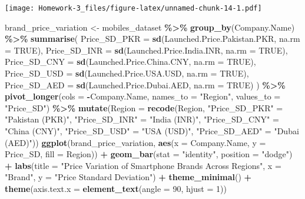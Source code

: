 \documentclass[
]{article}
\newenvironment{Shaded}{\begin{snugshade}}{\end{snugshade}}
\newcommand{\AttributeTok}[1]{\textcolor[rgb]{0.13,0.29,0.53}{#1}}
\newcommand{\ConstantTok}[1]{\textcolor[rgb]{0.56,0.35,0.01}{#1}}
\newcommand{\DecValTok}[1]{\textcolor[rgb]{0.00,0.00,0.81}{#1}}
\newcommand{\FunctionTok}[1]{\textcolor[rgb]{0.13,0.29,0.53}{\textbf{#1}}}
\newcommand{\NormalTok}[1]{#1}
\newcommand{\OtherTok}[1]{\textcolor[rgb]{0.56,0.35,0.01}{#1}}
\newcommand{\SpecialCharTok}[1]{\textcolor[rgb]{0.81,0.36,0.00}{\textbf{#1}}}
\newcommand{\StringTok}[1]{\textcolor[rgb]{0.31,0.60,0.02}{#1}}
\begin{document}
\texttt{[image: Homework-3\_files/figure-latex/unnamed-chunk-14-1.pdf]}

\begin{Shaded}
\begin{Highlighting}[]
\NormalTok{brand\_price\_variation }\OtherTok{\textless{}{-}}\NormalTok{ mobiles\_dataset }\SpecialCharTok{\%\textgreater{}\%}
  \FunctionTok{group\_by}\NormalTok{(Company.Name) }\SpecialCharTok{\%\textgreater{}\%}
  \FunctionTok{summarise}\NormalTok{(}
    \AttributeTok{Price\_SD\_PKR =} \FunctionTok{sd}\NormalTok{(Launched.Price.Pakistan.PKR, }\AttributeTok{na.rm =} \ConstantTok{TRUE}\NormalTok{),}
    \AttributeTok{Price\_SD\_INR =} \FunctionTok{sd}\NormalTok{(Launched.Price.India.INR, }\AttributeTok{na.rm =} \ConstantTok{TRUE}\NormalTok{),}
    \AttributeTok{Price\_SD\_CNY =} \FunctionTok{sd}\NormalTok{(Launched.Price.China.CNY, }\AttributeTok{na.rm =} \ConstantTok{TRUE}\NormalTok{),}
    \AttributeTok{Price\_SD\_USD =} \FunctionTok{sd}\NormalTok{(Launched.Price.USA.USD, }\AttributeTok{na.rm =} \ConstantTok{TRUE}\NormalTok{),}
    \AttributeTok{Price\_SD\_AED =} \FunctionTok{sd}\NormalTok{(Launched.Price.Dubai.AED, }\AttributeTok{na.rm =} \ConstantTok{TRUE}\NormalTok{)}
\NormalTok{  ) }\SpecialCharTok{\%\textgreater{}\%}
  \FunctionTok{pivot\_longer}\NormalTok{(}\AttributeTok{cols =} \SpecialCharTok{{-}}\NormalTok{Company.Name, }\AttributeTok{names\_to =} \StringTok{"Region"}\NormalTok{, }\AttributeTok{values\_to =} \StringTok{"Price\_SD"}\NormalTok{) }\SpecialCharTok{\%\textgreater{}\%}
  \FunctionTok{mutate}\NormalTok{(}\AttributeTok{Region =} \FunctionTok{recode}\NormalTok{(Region,}
                         \StringTok{"Price\_SD\_PKR"} \OtherTok{=} \StringTok{"Pakistan (PKR)"}\NormalTok{,}
                         \StringTok{"Price\_SD\_INR"} \OtherTok{=} \StringTok{"India (INR)"}\NormalTok{,}
                         \StringTok{"Price\_SD\_CNY"} \OtherTok{=} \StringTok{"China (CNY)"}\NormalTok{,}
                         \StringTok{"Price\_SD\_USD"} \OtherTok{=} \StringTok{"USA (USD)"}\NormalTok{,}
                         \StringTok{"Price\_SD\_AED"} \OtherTok{=} \StringTok{"Dubai (AED)"}\NormalTok{))}
\FunctionTok{ggplot}\NormalTok{(brand\_price\_variation, }\FunctionTok{aes}\NormalTok{(}\AttributeTok{x =}\NormalTok{ Company.Name, }\AttributeTok{y =}\NormalTok{ Price\_SD, }\AttributeTok{fill =}\NormalTok{ Region)) }\SpecialCharTok{+}
  \FunctionTok{geom\_bar}\NormalTok{(}\AttributeTok{stat =} \StringTok{"identity"}\NormalTok{, }\AttributeTok{position =} \StringTok{"dodge"}\NormalTok{) }\SpecialCharTok{+}
  \FunctionTok{labs}\NormalTok{(}\AttributeTok{title =} \StringTok{"Price Variation of Smartphone Brands Across Regions"}\NormalTok{,}
       \AttributeTok{x =} \StringTok{"Brand"}\NormalTok{, }\AttributeTok{y =} \StringTok{"Price Standard Deviation"}\NormalTok{) }\SpecialCharTok{+}
  \FunctionTok{theme\_minimal}\NormalTok{() }\SpecialCharTok{+}
  \FunctionTok{theme}\NormalTok{(}\AttributeTok{axis.text.x =} \FunctionTok{element\_text}\NormalTok{(}\AttributeTok{angle =} \DecValTok{90}\NormalTok{, }\AttributeTok{hjust =} \DecValTok{1}\NormalTok{))}
\end{Highlighting}
\end{Shaded}
\end{document}
